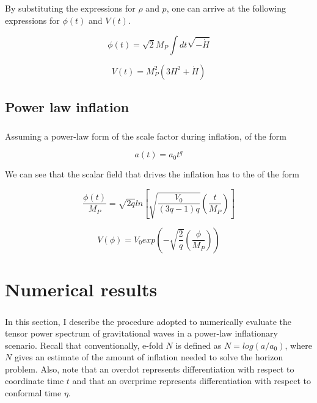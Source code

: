 \documentclass[12pt,a4paper,oneside]{book}
\begin{document}
\paragraph*{} By substituting the expressions for $\rho$ and $p$, one can arrive at the following expressions for $\phi(t)$ and $V(t)$.

\begin{equation}
\phi(t)= \sqrt{2}M_P \int dt \sqrt{-\dot{H}}
\end{equation}

\begin{equation}
V(t) = M_P^2(3H^2 + \dot{H})
\end{equation}

\section{Power law inflation}

\paragraph*{} Assuming a power-law form of the scale factor during inflation, of the form

\begin{equation}
a(t) = a_0t^q
\end{equation}

\noindent We can see that the scalar field that drives the inflation has to the of the form

\begin{equation}
\frac{\phi(t)}{M_P} =\sqrt{2q}ln[\sqrt{\frac{V_0}{(3q-1)q}}(\frac{t}{M_P})]
\end{equation}

\begin{equation}
V(\phi) = V_0exp(-\sqrt{\frac{2}{q}}(\frac{\phi}{M_P}))
\end{equation}



\chapter{Numerical results}

\paragraph{} In this section, I describe the procedure adopted to numerically evaluate the tensor power spectrum of gravitational waves in a power-law inflationary scenario. Recall that conventionally, e-fold $N$ is defined as $N = log(a/a_0)$, where $N$ gives an estimate of the amount of inflation needed to solve the horizon problem. Also, note that an overdot represents differentiation with respect to coordinate time $t$ and that an overprime represents differentiation with respect to conformal time $\eta$.
\end{document}
